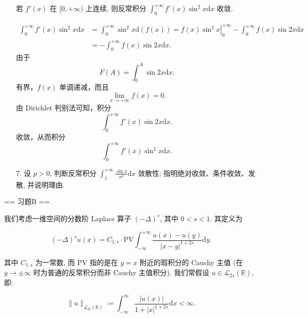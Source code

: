 \begin{enumerate}
    若 \(f'(x)\) 在 \([0, +\infty)\) 上连续, 则反常积分 \(\displaystyle\int_{0}^{+\infty} f'(x) \sin^{2} x \mathrm{d}x\) 收敛.
    \begin{solution}
        \[
        \begin{aligned}
        \int_{0}^{+\infty}f'(x)\sin^2{x}\mathrm{d}x
        &=\int_{0}^{+\infty}\sin^2{x}\mathrm{d}(f(x))=\left.f(x)\sin^2{x}\right|_0^{+\infty}-\int_{0}^{+\infty}f(x)\sin{2x}\mathrm{d}x\\
        &=-\int_{0}^{+\infty}f(x)\sin{2x}\mathrm{d}x.
        \end{aligned}
        \]
        由于
        \[
        F(A)=\int_{0}^{A}\sin{2x}\mathrm{d}x.
        \]
        有界，$f(x)$ 单调递减，而且
        \[
        \lim_{x \to +\infty}f(x)=0.
        \]
        由 Dirichlet 判别法可知，积分
        \[
        \int_{0}^{+\infty}f'(x)\sin{2x}\mathrm{d}x.
        \]
        收敛，从而积分
        \[
        \int_{0}^{+\infty}f'(x)\sin^2{x}\mathrm{d}x.
        \]
    \end{solution}
    \item[7.]设 \(p > 0\), 判断反常积分 \(\displaystyle\int_{1}^{+\infty} \frac{\sin x}{x^{p}} \mathrm{d}x\) 敛散性; 指明绝对收敛、条件收敛、发散, 并说明理由.
\end{enumerate}

== 习题B ==

我们考虑一维空间的分数阶 Laplace 算子 \(\displaystyle(-\Delta)^{s}\), 其中 \(0< s< 1.\) 其定义为

\[\displaystyle(-\Delta)^{s}u(x) = C_{1,s}\cdot \mathrm{PV} \int_{-\infty}^{+\infty}\frac{u(x) - u(y)}{|x - y|^{1 + 2s}} \mathrm{d}y.\]

其中 \(C_{1,s}\) 为一常数, 而 $\mathrm{PV}$ 指的是在 \(y = x\) 附近的瑕积分的 Cauchy 主值 (在 \(y \to \pm \infty\) 时为普通的反常积分而非 Cauchy 主值积分). 
我们常假设 \(\displaystyle u \in \mathcal{L}_{2s}(\mathbb{R})\), 即:

\[\displaystyle\| u\|_{\mathcal{L}_{2s}(\mathbb{R})} \coloneqq \int_{-\infty}^{\infty} \frac{|u(x)|}{1 + |x|^{1 + 2s}} \mathrm{d}x < \infty.\]


